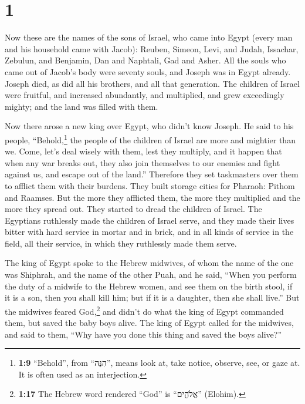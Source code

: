 \hypertarget{section}{%
\section{1}\label{section}}

 Now these are the names of the sons of Israel, who came
into Egypt (every man and his household came with Jacob): 
Reuben, Simeon, Levi, and Judah,  Issachar, Zebulun, and
Benjamin,  Dan and Naphtali, Gad and Asher. 
All the souls who came out of Jacob's body were seventy souls, and
Joseph was in Egypt already.  Joseph died, as did all his
brothers, and all that generation.  The children of Israel
were fruitful, and increased abundantly, and multiplied, and grew
exceedingly mighty; and the land was filled with them.

 Now there arose a new king over Egypt, who didn't know
Joseph.  He said to his people, ``Behold,\footnote{\textbf{1:9}
  ``Behold'', from ``הִנֵּה'', means look at, take notice, observe, see,
  or gaze at. It is often used as an interjection.} the people of the
children of Israel are more and mightier than we.  Come,
let's deal wisely with them, lest they multiply, and it happen that when
any war breaks out, they also join themselves to our enemies and fight
against us, and escape out of the land.''  Therefore they
set taskmasters over them to afflict them with their burdens. They built
storage cities for Pharaoh: Pithom and Raamses.  But the
more they afflicted them, the more they multiplied and the more they
spread out. They started to dread the children of Israel.
 The Egyptians ruthlessly made the children of Israel
serve,  and they made their lives bitter with hard
service in mortar and in brick, and in all kinds of service in the
field, all their service, in which they ruthlessly made them serve.

 The king of Egypt spoke to the Hebrew midwives, of whom
the name of the one was Shiphrah, and the name of the other Puah,
 and he said, ``When you perform the duty of a midwife to
the Hebrew women, and see them on the birth stool, if it is a son, then
you shall kill him; but if it is a daughter, then she shall live.''
 But the midwives feared God,\footnote{\textbf{1:17} The
  Hebrew word rendered ``God'' is ``אֱלֹהִ֑ים'' (Elohim).} and didn't do
what the king of Egypt commanded them, but saved the baby boys alive.
 The king of Egypt called for the midwives, and said to
them, ``Why have you done this thing and saved the boys alive?''

